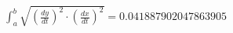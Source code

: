 \documentclass[preview]{standalone}
\begin{document}
\begin{align*}
\int_{a}^{b} \sqrt{\left(\frac{dy}{dt}\right)^2 \cdot \left(\frac{dx}{dt}\right)^2} = 0.041887902047863905
\end{align*}
\end{document}
